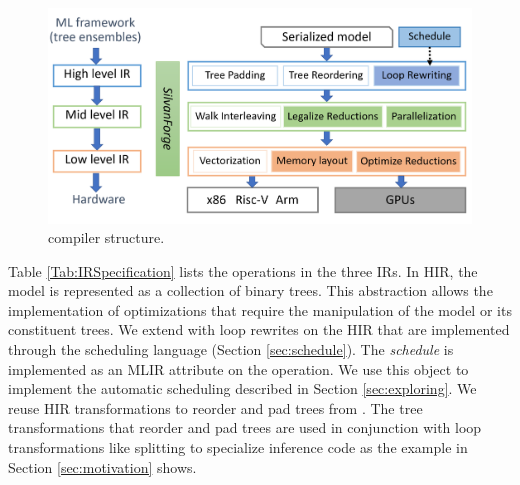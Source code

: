 \begin{figure}[htb]
  \centering
  \includegraphics[width=\linewidth]{figures/compiler.png}
  \caption{\Treebeard{} compiler structure.}
  \label{Fig:CompilerStructure}
\end{figure}

Table \ref{Tab:IRSpecification} lists the operations in the three IRs. 
In HIR, the model is represented as a collection of binary trees. This abstraction
allows the implementation of optimizations that require the manipulation of the model
or its constituent trees. We extend \TreebeardOLD{} with loop rewrites on 
the HIR that are implemented through the scheduling language (Section \ref{sec:schedule}).
The \emph{schedule} is implemented as an MLIR attribute on the  operation.
We use this object to implement the automatic scheduling described in Section \ref{sec:exploring}. 
We reuse HIR transformations to reorder and pad trees from \TreebeardOLD{}.
The tree transformations that reorder and pad trees are used in conjunction 
with loop transformations like splitting to specialize inference code as the example 
in Section \ref{sec:motivation} shows. 

